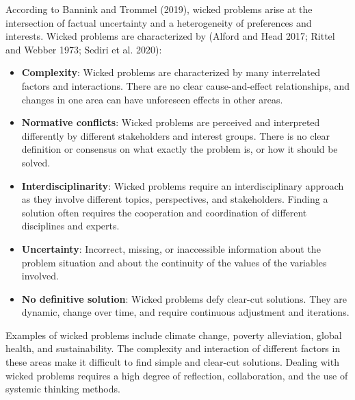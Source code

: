 \documentclass[
  a4paper,
  DIV=11,
  numbers=noendperiod,
  oneside,
  openany]{scrreprt}
\begin{document}
\begin{tcolorbox}[enhanced jigsaw, arc=.35mm, bottomrule=.15mm, bottomtitle=1mm, breakable, colback=white, colbacktitle=quarto-callout-note-color!10!white, colframe=quarto-callout-note-color-frame, coltitle=black, left=2mm, leftrule=.75mm, opacityback=0, opacitybacktitle=0.6, rightrule=.15mm, title={Wicked problems}, titlerule=0mm, toprule=.15mm, toptitle=1mm]

According to Bannink and Trommel (2019), wicked problems arise at the
intersection of factual uncertainty and a heterogeneity of preferences
and interests. Wicked problems are characterized by (Alford and Head
2017; Rittel and Webber 1973; Sediri et al. 2020):

\begin{itemize}
\item
  \textbf{Complexity}: Wicked problems are characterized by many
  interrelated factors and interactions. There are no clear
  cause-and-effect relationships, and changes in one area can have
  unforeseen effects in other areas.
\item
  \textbf{Normative conflicts}: Wicked problems are perceived and
  interpreted differently by different stakeholders and interest groups.
  There is no clear definition or consensus on what exactly the problem
  is, or how it should be solved.
\item
  \textbf{Interdisciplinarity}: Wicked problems require an
  interdisciplinary approach as they involve different topics,
  perspectives, and stakeholders. Finding a solution often requires the
  cooperation and coordination of different disciplines and experts.
\item
  \textbf{Uncertainty}: Incorrect, missing, or inaccessible information
  about the problem situation and about the continuity of the values of
  the variables involved.
\item
  \textbf{No definitive solution}: Wicked problems defy clear-cut
  solutions. They are dynamic, change over time, and require continuous
  adjustment and iterations.
\end{itemize}

Examples of wicked problems include climate change, poverty alleviation,
global health, and sustainability. The complexity and interaction of
different factors in these areas make it difficult to find simple and
clear-cut solutions. Dealing with wicked problems requires a high degree
of reflection, collaboration, and the use of systemic thinking methods.

\end{tcolorbox}
\end{document}

